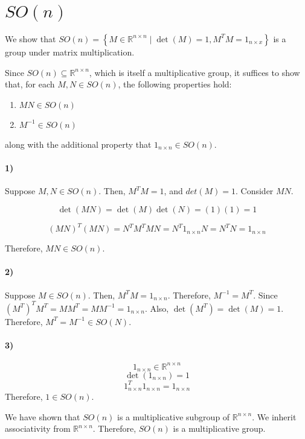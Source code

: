 \documentclass{article}
\begin{document}
\section{$SO(n)$}

We show that $SO(n) = \left\{ M \in \mathbb{R}^{n \times n} 
		\mid \det(M) = 1, M^T M = 1_{n \times x} \right\}$
	is a group under matrix multiplication.

Since $SO(n) \subseteq \mathbb{R}^{n \times n}$,
	which is itself a multiplicative group,
	it suffices to show that, for each $M, N \in SO(n)$,
	the following properties hold:

\begin{enumerate}
\item $M N \in SO(n)$
\item $M^{-1} \in SO(n)$
\end{enumerate}

along with the additional property that $1_{n \times n} \in SO(n)$.

\paragraph{1)}
Suppose $M, N \in SO(n)$.
Then, $M^T M = 1$, and $det(M) = 1$.
Consider $M N$.

\[ \det(M N) = \det(M) \det(N) = \left( 1 \right) \left( 1 \right) = 1 \]

\[ \left( M N \right)^T \left( M N \right) = N^T M^T M N
	= N^T 1_{n \times n} N = N^T N = 1_{n \times n} \]

Therefore, $M N \in SO(n)$.

\paragraph{2)}
Suppose $M \in SO(n)$.
Then, $M^T M = 1_{n \times n}$.
Therefore, $M^{-1} = M^T$.
Since $\left( M^T \right)^T M^T = M M^T = M M^{-1} = 1_{n \times n}$.
Also, $\det(M^T) = \det(M) = 1$.
Therefore, $M^T = M^{-1} \in SO(N)$.

\paragraph{3)}
\[1_{n \times n} \in \mathbb{R}^{n \times n}\]
\[\det(1_{n \times n}) = 1\]
\[ 1_{n \times n}^T 1_{n \times n} = 1_{n \times n}\]
Therefore, $1 \in SO(n)$.

We have shown that $SO(n)$ is a multiplicative subgroup of $\mathbb{R}^{n \times n}$.
We inherit associativity from $\mathbb{R}^{n \times n}$.
Therefore, $SO(n)$ is a multiplicative group.
\end{document}

